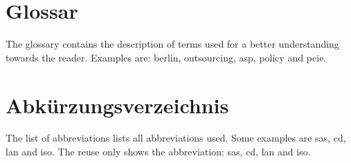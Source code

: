 \section{Glossar}
The glossary contains the description of terms used for a better understanding towards the reader. Examples are: \gls{berlin}, \gls{outsourcing}, \gls{asp}, \gls{policy} and \gls{pcie}.


\section{Abkürzungsverzeichnis}
The list of abbreviations lists all abbreviations used. Some examples are \gls{sas}, \gls{cd}, \gls{lan} and \gls{iso}. The reuse only shows the abbreviation: \gls{sas}, \gls{cd}, \gls{lan} and \gls{iso}.